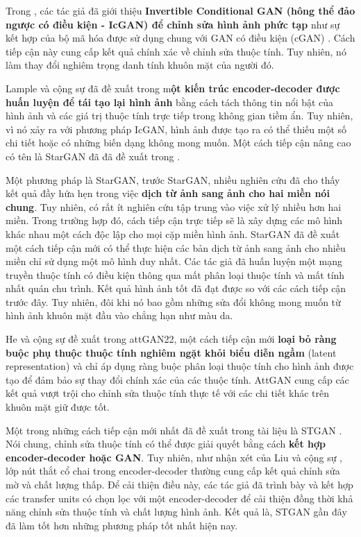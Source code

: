 \documentclass{article}
\begin{document}
Trong , các tác giả đã giới thiệu \textbf{Invertible Conditional GAN (hông thể đảo ngược có điều kiện - IcGAN) để chỉnh sửa hình ảnh phức tạp} như sự kết hợp của bộ mã hóa được sử dụng chung với GAN có điều kiện (cGAN) . Cách tiếp cận này cung cấp kết quả chính xác về chỉnh sửa thuộc tính. Tuy nhiên, nó làm thay đổi nghiêm trọng danh tính khuôn mặt của người đó.

Lample và cộng sự đã đề xuất trong  m\textbf{ột kiến trúc encoder-decoder được huấn luyện để tái tạo lại hình ảnh} bằng cách tách thông tin nổi bật của hình ảnh và các giá trị thuộc tính trực tiếp trong không gian tiềm ẩn. Tuy nhiên, vì nó xảy ra với phương pháp IcGAN, hình ảnh được tạo ra có thể thiếu một số chi tiết hoặc có những biến dạng không mong muốn. Một cách tiếp cận nâng cao có tên là StarGAN đã đã đề xuất trong .

Một phương pháp là StarGAN, trước StarGAN, nhiều nghiên cứu đã cho thấy kết quả đầy hứa hẹn trong việc \textbf{dịch từ ảnh sang ảnh cho hai miền nói chung}. Tuy nhiên, có rất ít nghiên cứu tập trung vào việc xử lý nhiều hơn hai miền. Trong trường hợp đó, cách tiếp cận trực tiếp sẽ là xây dựng các mô hình khác nhau một cách độc lập cho mọi cặp miền hình ảnh. StarGAN đã đề xuất một cách tiếp cận mới có thể thực hiện các bản dịch từ ảnh sang ảnh cho nhiều miền chỉ sử dụng một mô hình duy nhất. Các tác giả đã huấn luyện một mạng truyền thuộc tính có điều kiện thông qua mất phân loại thuộc tính và mất tính nhất quán chu trình. Kết quả hình ảnh tốt đã đạt được so với các cách tiếp cận trước đây. Tuy nhiên, đôi khi nó bao gồm những sửa đổi không mong muốn từ hình ảnh khuôn mặt đầu vào chẳng hạn như màu da.

He và cộng sự đề xuất trong  attGAN22, một cách tiếp cận mới \textbf{loại bỏ ràng buộc phụ thuộc thuộc tính nghiêm ngặt khỏi biểu diễn ngầm} (latent representation) và chỉ áp dụng ràng buộc phân loại thuộc tính cho hình ảnh được tạo để đảm bảo sự thay đổi chính xác của các thuộc tính. AttGAN cung cấp các kết quả vượt trội cho chỉnh sửa thuộc tính thực tế với các chi tiết khác trên khuôn mặt giữ được tốt.

Một trong những cách tiếp cận mới nhất đã đề xuất trong tài liệu là STGAN . Nói chung, chỉnh sửa thuộc tính có thể được giải quyết bằng cách \textbf{kết hợp encoder-decoder hoặc GAN}. Tuy nhiên, như nhận xét của Liu và cộng sự , lớp nút thắt cổ chai trong encoder-decoder thường cung cấp kết quả chỉnh sửa mờ và chất lượng thấp. Để cải thiện điều này, các tác giả đã trình bày và kết hợp các transfer units có chọn lọc với một encoder-decoder để cải thiện đồng thời khả năng chỉnh sửa thuộc tính và chất lượng hình ảnh. Kết quả là, STGAN gần đây đã làm tốt hơn những phương pháp tốt nhất hiện nay.
\end{document}
